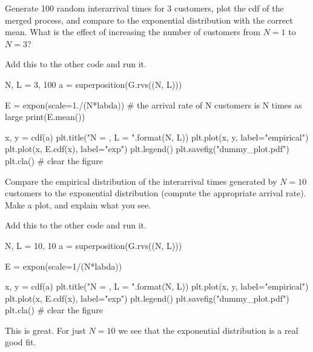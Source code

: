 \documentclass{scrartcl}
\begin{document}
\begin{exercise}
  Generate 100 random interarrival times for 3 customers, plot the cdf of the merged process, and compare to the exponential distribution with the correct mean. What is the effect of increasing the number of customers from $N=1$ to $N=3$?
\begin{solution}
Add this to the other code and run it. 
\begin{pyverbatim}
N, L = 3, 100
a = superposition(G.rvs((N, L)))

E = expon(scale=1./(N*labda)) # the arrival rate of N customers is N times as large
print(E.mean())

x, y = cdf(a)
plt.title("N = {}, L = {}".format(N, L))
plt.plot(x, y,  label="empirical")
plt.plot(x, E.cdf(x),  label="exp")
plt.legend()
plt.savefig("dummy_plot.pdf")
plt.cla() # clear the figure
\end{pyverbatim}

\end{solution}
\end{exercise}


\begin{exercise}
  Compare  the empirical distribution of the interarrival times generated by  $N=10$ customers to the exponential distribution (compute the appropriate arrival rate). Make a plot, and explain what you see.
\begin{solution}
Add this to the other code and run it. 
\begin{pyverbatim}
N, L = 10, 10
a = superposition(G.rvs((N, L)))

E = expon(scale=1/(N*labda))

x, y = cdf(a)
plt.title("N = {}, L = {}".format(N, L))
plt.plot(x, y,  label="empirical")
plt.plot(x, E.cdf(x),  label="exp")
plt.legend()
plt.savefig("dummy_plot.pdf")
plt.cla() # clear the figure
\end{pyverbatim}

This is great. For just $N=10$ we see that the exponential distribution is a real good fit. 
\end{solution}
\end{exercise}
\end{document}
